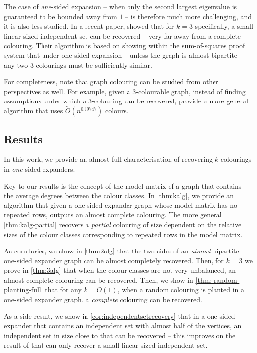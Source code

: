 The case of \textit{one}-sided expansion -- when only the second largest eigenvalue is guaranteed to be bounded away from \(1\) -- is therefore much more challenging, and it is also less studied. In a recent paper, \cite{bafna-hsieh-kothari} showed that for $k=3$ specifically, a small linear-sized independent set can be recovered -- very far away from a complete colouring. Their algorithm is based on showing within the sum-of-squares proof system \cite{barak-raghavendra-steurer} that under one-sided expansion -- unless the graph is almost-bipartite -- any two $3$-colourings must be sufficiently similar.

For completeness, note that graph colouring can be studied from other perspectives as well. For example, given a $3$-colourable graph, instead of finding assumptions under which a $3$-colouring can be recovered, \cite{MR4764817-24} provide a more general algorithm that uses $\tilde{O}(n^{0.19747})$ colours.

\subsection{Results}

In this work, we provide an almost full characterisation of recovering $k$-colourings in \textit{one}-sided expanders.

Key to our results is the concept of the model matrix of a graph that contains the average degrees between the colour classes. In \cref{thm:kalg}, we provide an algorithm that given a one-sided expander graph whose model matrix has no repeated rows, outputs an almost complete colouring. The more general \cref{thm:kalg-partial} recovers a \textit{partial} colouring of size dependent on the relative sizes of the colour classes corresponding to repeated rows in the model matrix.

As corollaries, we show in \cref{thm:2alg} that the two sides of an \textit{almost} bipartite one-sided expander graph can be almost completely recovered. Then, for $k=3$ we prove in \cref{thm:3alg} that when the colour classes are not very unbalanced, an almost complete colouring can be recovered. Then, we show in \cref{thm: random-planting-full} that for any $k=O(1)$, when a random colouring is planted in a one-sided expander graph, a \textit{complete} colouring can be recovered.

As a side result, we show in \cref{cor:independentsetrecovery} that in a one-sided expander that contains an independent set with almost half of the vertices, an independent set in size close to that can be recovered -- this improves on the result of \cite{bafna-hsieh-kothari} that can only recover a small linear-sized independent set.

